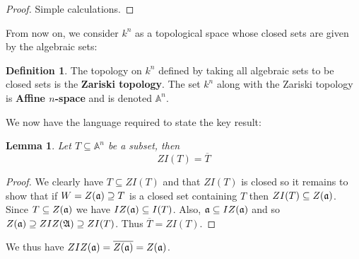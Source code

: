 \documentclass[12pt]{article}
\theoremstyle{plain}
\newtheorem{lemma}[thm]{Lemma}
\theoremstyle{definition}
\newtheorem{defn}[thm]{Definition} %
\newcommand{\bb}[1]{\mathbb{#1}}
\begin{document}
\begin{proof}
Simple calculations.
\end{proof}
From now on, we consider $k^n$ as a topological space whose closed sets are given by the algebraic sets:
\begin{defn}
The topology on $k^n$ defined by taking all algebraic sets to be closed sets is the \textbf{Zariski topology}. The set $k^n$ along with the Zariski topology is \textbf{Affine $n$-space} and is denoted $\bb{A}^n$.
\end{defn}
We now have the language required to state the key result:
\begin{lemma}
Let $T \subseteq \bb{A}^n$ be a subset, then
\begin{equation}
    ZI(T) = \overline{T}
\end{equation}
\end{lemma}
\begin{proof}
We clearly have $T \subseteq ZI(T)$ and that $ZI(T)$ is closed so it remains to show that if $W = Z(\frak{a}) \supseteq T$ is a closed set containing $T$ then $ZI(T) \subseteq Z(\frak{a})$.  Since $T \subseteq Z(\frak{a})$ we have $IZ(\frak{a}) \subseteq I(T)$. Also, $\frak{a} \subseteq IZ(\frak{a})$ and so $Z(\frak{a}) \supseteq ZIZ(\frak{A}) \supseteq ZI(T)$. Thus $\overline{T} = ZI(T)$.
\end{proof}
We thus have $ZIZ(\frak{a}) = \overline{Z(\frak{a})} = Z(\frak{a})$.
\end{document}
